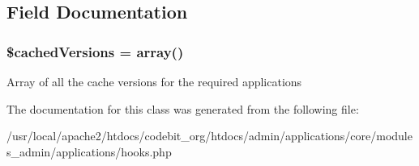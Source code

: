 \subsection{Field Documentation}
\hypertarget{classadmin__core__applications__hooks_abc2522d2c984c7fbf33334118c6b15ea}{
\subsubsection[{\$cached\-Versions}]{\setlength{\rightskip}{0pt plus 5cm}\$cached\-Versions = array()\hspace{0.3cm}{\ttfamily [protected]}}}\label{classadmin__core__applications__hooks_abc2522d2c984c7fbf33334118c6b15ea}
Array of all the cache versions for the required applications 

The documentation for this class was generated from the following file\-:\begin{DoxyCompactItemize}
\item 
/usr/local/apache2/htdocs/codebit\-\_\-org/htdocs/admin/applications/core/modules\-\_\-admin/applications/hooks.\-php\end{DoxyCompactItemize}
